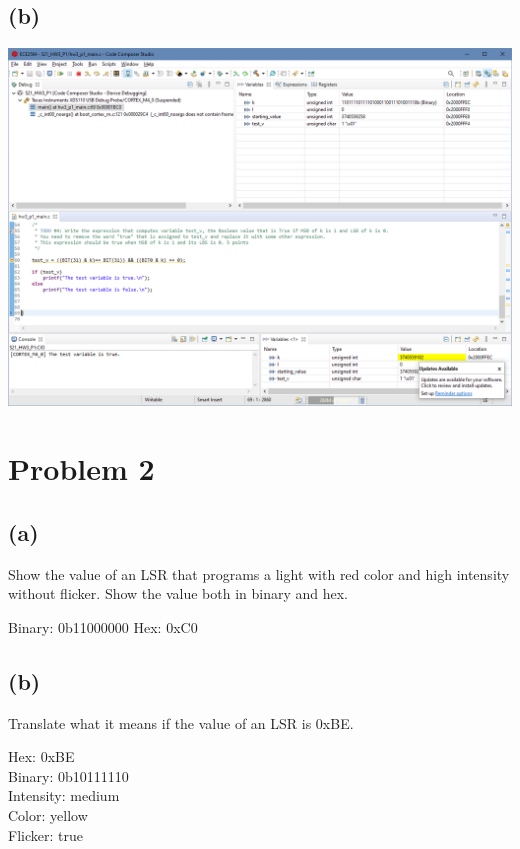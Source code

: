 \documentclass{article}
\begin{document}
\subsection*{(b)}
\begin{center}
    \includegraphics[width = \textwidth]{part1.png}
\end{center}
\newpage
\section*{Problem 2}
\subsection*{(a)}
Show the value of an LSR that programs a light with red color and high intensity without flicker. Show the value both in binary and hex. 
\begin{center}
    Binary: 0b11000000
    Hex: 0xC0
\end{center}
\subsection*{(b)}
Translate what it means if the value of an LSR is 0xBE.
\begin{center}
    Hex: 0xBE \\
    Binary: 0b10111110 \\
    Intensity: medium \\
    Color: yellow \\
    Flicker: true
\end{center}
\end{document}
